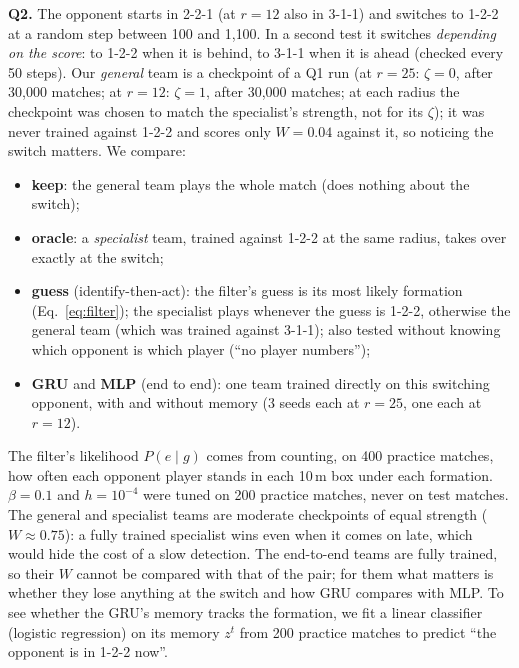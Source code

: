 \documentclass{article}
\begin{document}
\textbf{Q2.} The opponent starts in 2-2-1 (at $r=12$ also in 3-1-1) and switches to 1-2-2 at a random step between
100 and 1{,}100. In a second test it switches \emph{depending on the score}: to 1-2-2 when it is behind, to 3-1-1 when
it is ahead (checked every 50 steps). Our \emph{general} team is a checkpoint of a Q1 run (at $r=25$: $\zeta=0$, after
30{,}000 matches; at $r=12$: $\zeta=1$, after 30{,}000 matches; at each radius the checkpoint was chosen to match the
specialist's strength, not for its $\zeta$); it was never trained against 1-2-2 and scores only
$W=0.04$ against it, so noticing the switch matters. We compare:
\begin{itemize}[leftmargin=1.5em]
\item \textbf{keep}: the general team plays the whole match (does nothing about the switch);
\item \textbf{oracle}: a \emph{specialist} team, trained against 1-2-2 at the same radius, takes over exactly at the
switch;
\item \textbf{guess} (identify-then-act): the filter's guess is its most likely formation (Eq.~\ref{eq:filter}); the
specialist plays whenever the guess is 1-2-2, otherwise the general team (which was trained against 3-1-1); also tested without knowing which opponent is which player (``no player numbers'');
\item \textbf{GRU} and \textbf{MLP} (end to end): one team trained directly on this switching opponent, with and
without memory (3 seeds each at $r=25$, one each at $r=12$).
\end{itemize}
The filter's likelihood $P(e\mid g)$ comes from counting, on 400 practice matches, how often each opponent player
stands in each 10\,m box under each formation. $\beta=0.1$ and $h=10^{-4}$ were tuned on 200 practice matches, never
on test matches. The general and specialist teams are moderate checkpoints of equal strength ($W\approx0.75$): a fully
trained specialist wins even when it comes on late, which would hide the cost of a slow detection. The end-to-end
teams are fully trained, so their $W$ cannot be compared with that of the pair; for them what matters is whether they
lose anything at the switch and how GRU compares with MLP. To see whether the GRU's memory tracks the formation, we
fit a linear classifier (logistic regression) on its memory $z^t$ from 200 practice matches to predict ``the opponent
is in 1-2-2 now''.
\end{document}
